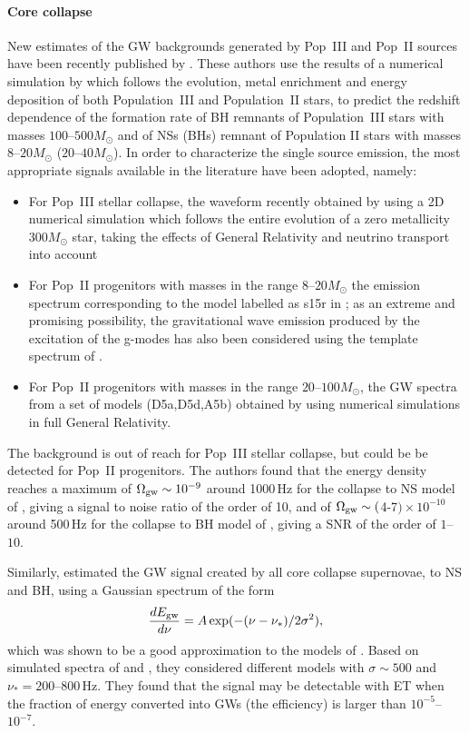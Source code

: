 \paragraph{Core collapse}

New estimates of the GW backgrounds generated by Pop~III and Pop~II sources
have been recently published by \cite{Marassi:2009}.
These authors use the results of a numerical simulation by \cite{2007MNRAS.382..945T} which follows the evolution, metal enrichment and energy deposition of both Population~III and Population~II stars, to predict the redshift dependence of the formation rate of BH remnants of
Population~III stars with masses $100$--$500 M_{\odot}$ and of NSs (BHs) remnant of Population II stars with masses $8$--$20 M_{\odot}$ ($20$--$40 M_{\odot}$).
In order to characterize the single source emission, the most appropriate signals available in the literature have been adopted, namely:
\begin{itemize}
\item For Pop~III stellar collapse, the waveform recently obtained by \cite{Suwa:2007} using a 2D numerical
simulation which follows the entire evolution of a zero metallicity $300M_{\odot}$ star, taking the effects of General Relativity
and neutrino transport into account
\item For Pop~II progenitors with masses in the range $8$--$20M_{\odot}$ the emission spectrum corresponding
to the model labelled as s15r in \cite{Muller:2004}; as an extreme and promising possibility, the gravitational
wave emission produced by the excitation of the g-modes has also been considered using the template
spectrum of \cite{Ott:2006}.
\item For Pop~II progenitors with masses in the range $20$--$100M_{\odot}$, the GW spectra from a set of models (D5a,D5d,A5b) obtained by \cite{Sekiguchi:2005} using numerical simulations in full General Relativity.
\end{itemize}
The background is out of reach for Pop~III stellar collapse, but could be be detected for Pop~II progenitors. The authors found that the energy density reaches a maximum  of $\Omega_{\rm gw} \sim 10^{-9}$ around 1000\,Hz for the collapse to NS model of \cite{Ott:2006}, giving a signal to noise ratio of the order of 10, and of $\Omega_{\rm gw} \sim ($4-7$) \times 10^{-10}$ around 500\,Hz for the collapse to BH model of \cite{Sekiguchi:2005}, giving a SNR of the order of $1$--$10$.

Similarly, \cite{2010MNRAS.409L.132Z} estimated the GW signal created by all core collapse supernovae, to NS and BH, using a Gaussian spectrum of the form 
\begin{equation}
\frac{dE_{\rm gw}}{d\nu}=A \exp (-(\nu-\nu_*) / 2 \sigma^2),
\end{equation}
which was shown to be a good approximation to the models of \cite{2004ApJ...600..834O}.
Based on simulated spectra of \cite{Dimmelmeier2007} and \cite{Sekiguchi:2005}, they considered different models with $\sigma \sim 500$  and $\nu_* = 200$--$800$\,Hz. They found that the signal may be detectable with ET when the fraction of energy converted into GWs (the efficiency) is larger than  $10^{-5}$--$10^{-7}$.


